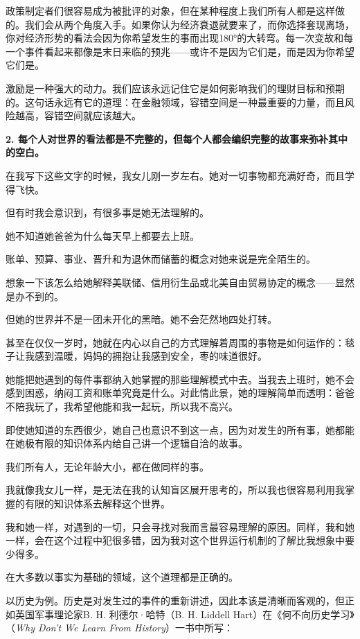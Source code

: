 政策制定者们很容易成为被批评的对象，但在某种程度上我们所有人都是这样做的。我们会从两个角度入手。如果你认为经济衰退就要来了，而你选择套现离场，你对经济形势的看法会因为你希望发生的事而出现180°的大转弯。每一次变故和每一个事件看起来都像是末日来临的预兆——或许不是因为它们是，而是因为你希望它们是。

激励是一种强大的动力。我们应该永远记住它是如何影响我们的理财目标和预期的。这句话永远有它的道理：在金融领域，容错空间是一种最重要的力量，而且风险越高，容错空间就应该越大。

\textbf{2. 每个人对世界的看法都是不完整的，但每个人都会编织完整的故事来弥补其中的空白。}

在我写下这些文字的时候，我女儿刚一岁左右。她对一切事物都充满好奇，而且学得飞快。

但有时我会意识到，有很多事是她无法理解的。

她不知道她爸爸为什么每天早上都要去上班。

账单、预算、事业、晋升和为退休而储蓄的概念对她来说是完全陌生的。

想象一下该怎么给她解释美联储、信用衍生品或北美自由贸易协定的概念——显然是办不到的。

但她的世界并不是一团未开化的黑暗。她不会茫然地四处打转。

甚至在仅仅一岁时，她就在内心以自己的方式理解着周围的事物是如何运作的：毯子让我感到温暖，妈妈的拥抱让我感到安全，枣的味道很好。

她能把她遇到的每件事都纳入她掌握的那些理解模式中去。当我去上班时，她不会感到困惑，纳闷工资和账单究竟是什么。对此情此景，她的理解简单而透明：爸爸不陪我玩了，我希望他能和我一起玩，所以我不高兴。

即使她知道的东西很少，她自己也意识不到这一点，因为对发生的所有事，她都能在她极有限的知识体系内给自己讲一个逻辑自洽的故事。

我们所有人，无论年龄大小，都在做同样的事。

我就像我女儿一样，是无法在我的认知盲区展开思考的，所以我也很容易利用我掌握的有限的知识体系去解释这个世界。

我和她一样，对遇到的一切，只会寻找对我而言最容易理解的原因。同样，我和她一样，会在这个过程中犯很多错，因为我对这个世界运行机制的了解比我想象中要少得多。

在大多数以事实为基础的领域，这个道理都是正确的。

以历史为例。历史是对发生过的事件的重新讲述，因此本该是清晰而客观的，但正如英国军事理论家B. H. 利德尔·哈特（B. H. Liddell Hart）在《何不向历史学习》（\textit{Why Don’t We Learn From History}）一书中所写：


